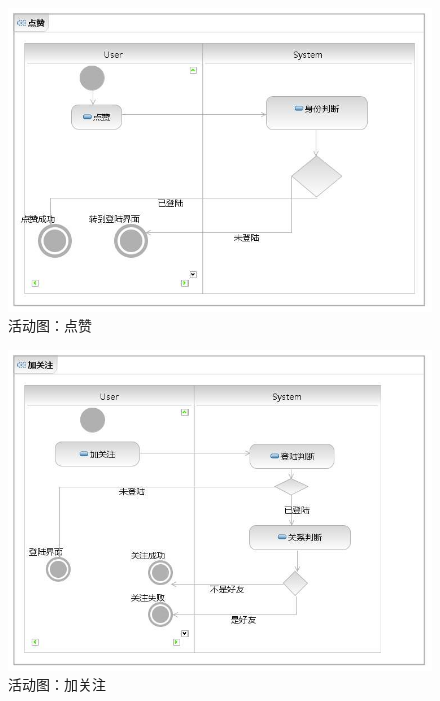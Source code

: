 \documentclass[a4paper,14pt]{ctexart}
\begin{document}
\begin{figure}[H]
\centering\includegraphics[width=4.5in]{活动图-点赞.jpeg}
\caption{活动图：点赞}
\end{figure}

\begin{figure}[H]
\centering\includegraphics[width=4.5in]{活动图-加关注.jpeg}
\caption{活动图：加关注}
\end{figure}
\end{document}
